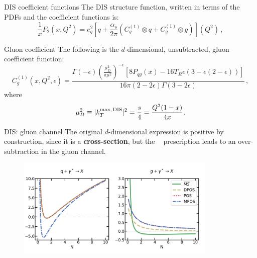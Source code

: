 \documentclass[9pt]{beamer}
\DeclareMathOperator{\msbar}{\overline{MS}}
\begin{document}
\begin{frame}{DIS coefficient functions}
    The DIS structure function, written in terms of the PDFs and the coefficient functions is:
    \begin{equation*}
        \frac{1}{x} F_2(x,Q^2)= e_q^2 \left[q
        +\frac{\alpha_s}{2\pi}\left( C^{(1)}_q \otimes q+ C^{(1)}_g \otimes
        g\right)\right](Q^2)\,,
    \end{equation*}

    \vspace*{15pt}
    \begin{block}{Gluon coefficient}
        The following is the $d$-dimensional, unsubtracted, gluon coefficient function:
        \begin{equation*}
            \label{eq:cgeps}
            C^{(1)}_{g}(x,Q^2,\epsilon) = \frac{ \Gamma(-\epsilon)
            \left(\frac{\mu_D^2}{\pi\mu^2}\right)^{-\epsilon} \left[8P_{qg}(x)-16 T_R \epsilon (3
            -\epsilon(2 -\epsilon) )  \right]  }{16\pi (2 - 2\epsilon) \Gamma (3 - 2 \epsilon)}\,,
        \end{equation*}
        where
        \begin{equation*}
            \label{eq:mud}
            \mu_D^2\equiv|k_T^{\text{max,\,DIS}}|^2=\frac{s}{4}=\frac{Q^2(1-x)}{4x},
        \end{equation*}
    \end{block}
\end{frame}

\begin{frame}{DIS: gluon channel}
    The original $d$-dimensional expression is positive by construction, since
    it is a \textbf{cross-section}, but the $\msbar$ prescription leads to an
    over-subtraction in the gluon channel.

    \begin{figure}
      \includegraphics[width=0.85\textwidth]{pictures/dis}
    \end{figure}
\end{frame}
\end{document}
